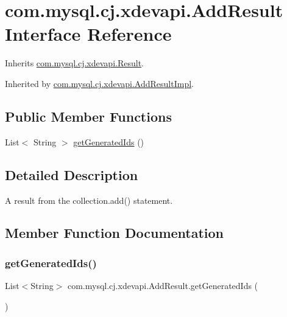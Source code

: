 \hypertarget{interfacecom_1_1mysql_1_1cj_1_1xdevapi_1_1_add_result}{}\section{com.\+mysql.\+cj.\+xdevapi.\+Add\+Result Interface Reference}
\label{interfacecom_1_1mysql_1_1cj_1_1xdevapi_1_1_add_result}


Inherits \mbox{\hyperlink{interfacecom_1_1mysql_1_1cj_1_1xdevapi_1_1_result}{com.\+mysql.\+cj.\+xdevapi.\+Result}}.



Inherited by \mbox{\hyperlink{classcom_1_1mysql_1_1cj_1_1xdevapi_1_1_add_result_impl}{com.\+mysql.\+cj.\+xdevapi.\+Add\+Result\+Impl}}.

\subsection*{Public Member Functions}
\begin{DoxyCompactItemize}
\item 
List$<$ String $>$ \mbox{\hyperlink{interfacecom_1_1mysql_1_1cj_1_1xdevapi_1_1_add_result_a504bce93cf6553a5983b79958a2536fb}{get\+Generated\+Ids}} ()
\end{DoxyCompactItemize}


\subsection{Detailed Description}
A result from the collection.\+add() statement. 

\subsection{Member Function Documentation}
\mbox{\label{interfacecom_1_1mysql_1_1cj_1_1xdevapi_1_1_add_result_a504bce93cf6553a5983b79958a2536fb}} 
\subsubsection{\texorpdfstring{get\+Generated\+Ids()}{getGeneratedIds()}}
{\footnotesize\ttfamily List$<$String$>$ com.\+mysql.\+cj.\+xdevapi.\+Add\+Result.\+get\+Generated\+Ids (\begin{DoxyParamCaption}{ }\end{DoxyParamCaption})}

